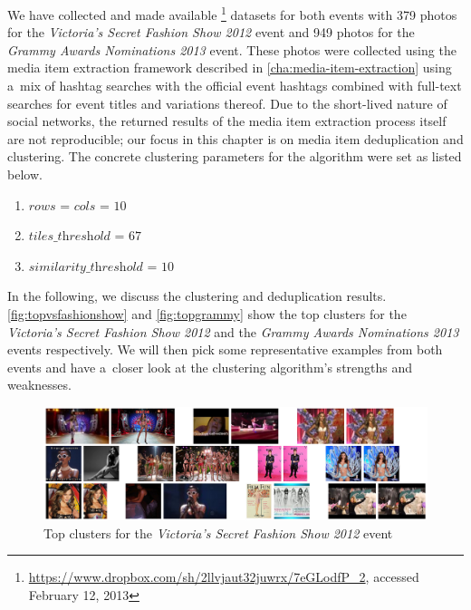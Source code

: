 We have collected and made available%
\footnote{\url{https://www.dropbox.com/sh/2llvjaut32juwrx/7eGLodfP_2},
accessed February 12, 2013}
datasets for both events with
379 photos for the \emph{Victoria's Secret Fashion Show 2012} event 
and 949 photos for the \emph{Grammy Awards Nominations 2013} event.
These photos were collected using the media item extraction framework
described in \autoref{cha:media-item-extraction}
using a~mix of hashtag searches with the official event hashtags combined
with full-text searches for event titles and variations thereof.
Due to the short-lived nature of social networks,
the returned results of the media item extraction process itself
are not reproducible; our focus in this chapter
is on media item deduplication and clustering.
The concrete clustering parameters for the algorithm were set as listed below.

\begin{enumerate}
  \item $\textit{rows}$ = $\textit{cols}$ = $10$
  \item $\textit{tiles\_threshold}$ = $67$
  \item $\textit{similarity\_threshold}$ = $10$
\end{enumerate}

In the following, we discuss the clustering and deduplication results.
\autoref{fig:topvsfashionshow} and \autoref{fig:topgrammy} show the top clusters
for the \emph{Victoria's Secret Fashion Show 2012} and the 
\emph{Grammy Awards Nominations 2013} events respectively.
We will then pick some representative examples from both events
and have a~closer look at the clustering algorithm's strengths and weaknesses.

\begin{figure}[h!]
  \centering
  \includegraphics[width=1.0\linewidth]{./vsfashionshow_clusters.png}
  \caption{Top clusters for the \emph{Victoria's Secret Fashion Show 2012} event}
  \label{fig:topvsfashionshow}
\end{figure}

